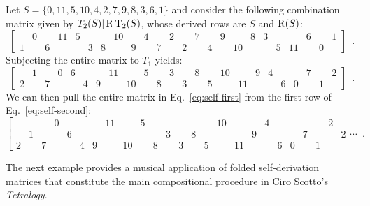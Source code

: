 \begin{example}
    \cite[221]{Starr1984}
    \label{self-folded}
    Let $S = \{ 0, 11, 5, 10, 4, 2, 7, 9, 8, 3, 6, 1 \}$ and consider the following combination matrix given by $T_2(S) | \operatorname{R}\operatorname{T}_2(S)$, whose derived rows are $S$ and $\operatorname{R}(S)$:
    \begin{equation}
        \label{eq:self-first}
        \left[
        \begin{array}{cccccccccccc|cccccccccccc}
            & 0 && 11 & 5 &&& 10 && 4 && 2 && 7 && 9 && 8 & 3 &&& 6 && 1 \\
            1 && 6 &&& 3 & 8 && 9 && 7 && 2 && 4 && 10 &&& 5 & 11 && 0 &
        \end{array}
        \right] \enspace.
    \end{equation}
    Subjecting the entire matrix to $T_1$ yields:
    \begin{equation}
        \label{eq:self-second}
        \left[
        \begin{array}{cccccccccccc|cccccccccccc}
            & 1 && 0 & 6 &&& 11 && 5 && 3 && 8 && 10 && 9 & 4 &&& 7 && 2 \\
            2 && 7 &&& 4 & 9 && 10 && 8 && 3 && 5 && 11 &&& 6 & 0 && 1 &
        \end{array}
        \right] \enspace.
    \end{equation}
    We can then pull the entire matrix in Eq.~\ref{eq:self-first} from the first row of Eq.~\ref{eq:self-second}:
    \begin{equation}
        \left[
        \begin{array}{cccccccccccc|cccccccccccc|c}
            &&& 0 &&&& 11 && 5 &&&&&& 10 &&& 4 &&&&& 2 & \\
            & 1 &&& 6 &&&&&&& 3 && 8 &&&& 9 &&&& 7 &&& 2 \\
            2 && 7 &&& 4 & 9 && 10 && 8 && 3 && 5 && 11 &&& 6 & 0 && 1 &&
        \end{array}
        \cdots \right. \enspace.
    \end{equation}
\end{example}

The next example provides a musical application of folded self-derivation matrices that constitute the main compositional procedure in Ciro Scotto's \emph{Tetralogy}.

